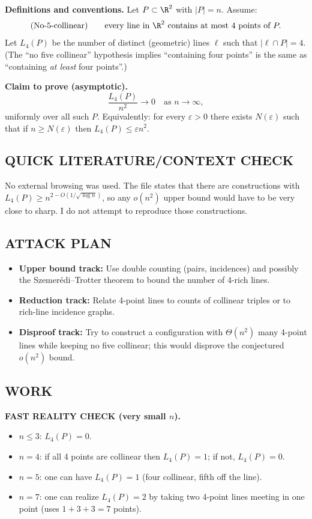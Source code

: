 \medskip
\noindent\textbf{Definitions and conventions.}
Let $P\subset\R^2$ with $|P|=n$.
Assume:
\[\text{(No-5-collinear)}\qquad \text{every line in }\R^2\text{ contains at most 4 points of }P.
\]
Let $L_4(P)$ be the number of distinct (geometric) lines $\ell$ such that $|\ell\cap P|=4$.
(The ``no five collinear'' hypothesis implies ``containing four points'' is the same as ``containing \emph{at least} four points''.)

\medskip
\noindent\textbf{Claim to prove (asymptotic).}
\[\frac{L_4(P)}{n^2}\to 0\quad\text{as }n\to\infty,\]
uniformly over all such $P$.
Equivalently: for every $\varepsilon>0$ there exists $N(\varepsilon)$ such that if $n\ge N(\varepsilon)$ then $L_4(P)\le \varepsilon n^2$.

\subsection*{QUICK LITERATURE/CONTEXT CHECK}
No external browsing was used.
The file states that there are constructions with $L_4(P)\ge n^{2-O(1/\sqrt{\log n})}$, so any $o(n^2)$ upper bound would have to be very close to sharp.
I do not attempt to reproduce those constructions.

\subsection*{ATTACK PLAN}
\begin{itemize}[leftmargin=2em]
\item \textbf{Upper bound track:} Use double counting (pairs, incidences) and possibly the Szemer\'edi--Trotter theorem to bound the number of 4-rich lines.
\item \textbf{Reduction track:} Relate 4-point lines to counts of collinear triples or to rich-line incidence graphs.
\item \textbf{Disproof track:} Try to construct a configuration with $\Theta(n^2)$ many 4-point lines while keeping no five collinear; this would disprove the conjectured $o(n^2)$ bound.
\end{itemize}

\subsection*{WORK}
\noindent\textbf{FAST REALITY CHECK (very small $n$).}
\begin{itemize}[leftmargin=2em]
\item $n\le 3$: $L_4(P)=0$.
\item $n=4$: if all 4 points are collinear then $L_4(P)=1$; if not, $L_4(P)=0$.
\item $n=5$: one can have $L_4(P)=1$ (four collinear, fifth off the line).
\item $n=7$: one can realize $L_4(P)=2$ by taking two 4-point lines meeting in one point (uses $1+3+3=7$ points).
\end{itemize}

